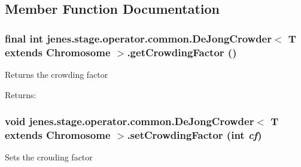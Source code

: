 \subsection{Member Function Documentation}
\hypertarget{classjenes_1_1stage_1_1operator_1_1common_1_1_de_jong_crowder_3_01_t_01extends_01_chromosome_01_4_f34ed99b72eedd09864a9c447179b04e}{
\subsubsection[getCrowdingFactor]{\setlength{\rightskip}{0pt plus 5cm}final int jenes.stage.operator.common.DeJongCrowder$<$ T extends Chromosome $>$.getCrowdingFactor ()}}
\label{classjenes_1_1stage_1_1operator_1_1common_1_1_de_jong_crowder_3_01_t_01extends_01_chromosome_01_4_f34ed99b72eedd09864a9c447179b04e}


Returns the crowding factor

\begin{Desc}
\item[Returns:]\end{Desc}
\hypertarget{classjenes_1_1stage_1_1operator_1_1common_1_1_de_jong_crowder_3_01_t_01extends_01_chromosome_01_4_3420256f796449f9f486e6dc85c52f0d}{
\subsubsection[setCrowdingFactor]{\setlength{\rightskip}{0pt plus 5cm}void jenes.stage.operator.common.DeJongCrowder$<$ T extends Chromosome $>$.setCrowdingFactor (int {\em cf})}}
\label{classjenes_1_1stage_1_1operator_1_1common_1_1_de_jong_crowder_3_01_t_01extends_01_chromosome_01_4_3420256f796449f9f486e6dc85c52f0d}


Sets the crouding factor

